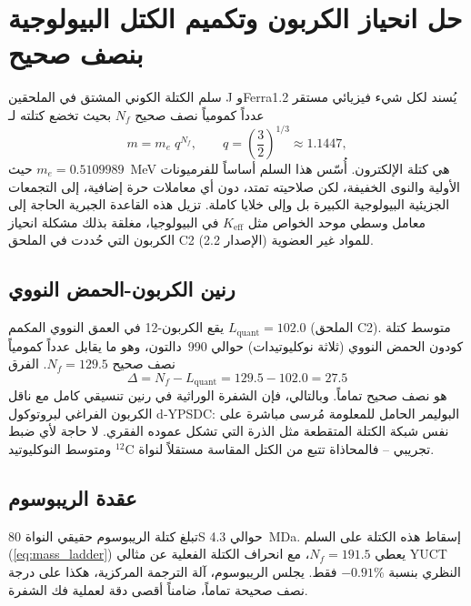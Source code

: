 \documentclass[11pt,a4paper]{article}
\begin{document}
	\section{حل انحياز الكربون وتكميم الكتل البيولوجية بنصف صحيح}
	\label{sec:quantization}
	
	سلم الكتلة الكوني المشتق في الملحقين J وFerra1.2 يُسند لكل شيء فيزيائي مستقر عدداً كمومياً نصف صحيح \(N_f\) بحيث تخضع كتلته لـ
	\begin{equation}
		m = m_e \; q^{N_f}, \qquad q = \left(\frac{3}{2}\right)^{1/3} \approx 1.1447,
		\label{eq:mass_ladder}
	\end{equation}
	حيث \(m_e = 0.5109989\)~MeV هي كتلة الإلكترون. أُسّس هذا السلم أساساً للفرميونات الأولية والنوى الخفيفة، لكن صلاحيته تمتد، دون أي معاملات حرة إضافية، إلى التجمعات الجزيئية البيولوجية الكبيرة بل وإلى خلايا كاملة. تزيل هذه القاعدة الجبرية الحاجة إلى معامل وسطي موحد الخواص مثل \(K_{\mathrm{eff}}\) في البيولوجيا، مغلقة بذلك مشكلة انحياز الكربون التي حُددت في الملحق C2 (الإصدار 2.2) للمواد غير العضوية.
	
	\subsection{رنين الكربون-الحمض النووي}
	يقع الكربون-12 في العمق النووي المكمم \(L_{\mathrm{quant}} = 102.0\) (الملحق C2). متوسط كتلة كودون الحمض النووي (ثلاثة نوكليوتيدات) حوالي 990~دالتون، وهو ما يقابل عدداً كمومياً نصف صحيح \(N_f = 129.5\). الفرق
	\[
	\Delta = N_f - L_{\mathrm{quant}} = 129.5 - 102.0 = 27.5
	\]
	هو نصف صحيح تماماً. وبالتالي، فإن الشفرة الوراثية في رنين تنسيقي كامل مع ناقل الكربون الفراغي لبروتوكول d‑YPSDC: البوليمر الحامل للمعلومة مُرسى مباشرة على نفس شبكة الكتلة المتقطعة مثل الذرة التي تشكل عموده الفقري. لا حاجة لأي ضبط تجريبي – فالمحاذاة تتبع من الكتل المقاسة مستقلاً لنواة \(^{12}\mathrm{C}\) ومتوسط النوكليوتيد.
	
	\subsection{عقدة الريبوسوم}
	تبلغ كتلة الريبوسوم حقيقي النواة 80S حوالي 4.3~MDa. إسقاط هذه الكتلة على السلم (\ref{eq:mass_ladder}) يعطي \(N_f = 191.5\)، مع انحراف الكتلة الفعلية عن مثالي YUCT النظري بنسبة \(-0.91\%\) فقط. يجلس الريبوسوم، آلة الترجمة المركزية، هكذا على درجة نصف صحيحة تماماً، ضامناً أقصى دقة لعملية فك الشفرة.
	
\end{document}
